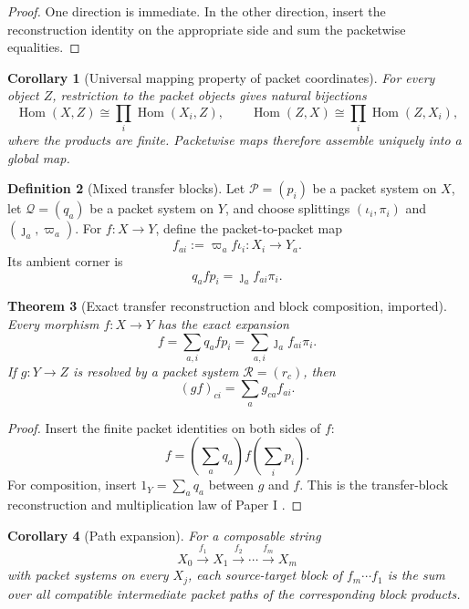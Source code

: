 \documentclass[11pt]{article}
\newtheorem{theorem}{Theorem}[section]
\newtheorem{corollary}[theorem]{Corollary}
\theoremstyle{definition}
\newtheorem{definition}[theorem]{Definition}
\theoremstyle{remark}
\begin{document}
\begin{proof}
One direction is immediate.  In the other direction, insert the reconstruction identity on the appropriate side and sum the packetwise equalities.
\end{proof}

\begin{corollary}[Universal mapping property of packet coordinates]
\label{cor:packet-universal-expanded}
For every object \(Z\), restriction to the packet objects gives natural bijections
\[
\operatorname{Hom}(X,Z)
\cong
\prod_i\operatorname{Hom}(X_i,Z),
\qquad
\operatorname{Hom}(Z,X)
\cong
\prod_i\operatorname{Hom}(Z,X_i),
\]
where the products are finite.  Packetwise maps therefore assemble uniquely into a global map.
\end{corollary}

\begin{definition}[Mixed transfer blocks]
\label{def:mixed-transfer-blocks-expanded}
Let \(\mathcal P=(p_i)\) be a packet system on \(X\), let \(\mathcal Q=(q_a)\) be a packet system on \(Y\), and choose splittings \((\iota_i,\pi_i)\) and \((\jmath_a,\varpi_a)\).  For \(f:X\to Y\), define the packet-to-packet map
\[
f_{ai}:=\varpi_a f\iota_i:X_i\longrightarrow Y_a.
\]
Its ambient corner is
\[
q_afp_i=\jmath_a f_{ai}\pi_i.
\]
\end{definition}

\begin{theorem}[Exact transfer reconstruction and block composition, imported]
\label{thm:transfer-reconstruction-expanded}
Every morphism \(f:X\to Y\) has the exact expansion
\[
\boxed{
f
=
\sum_{a,i}q_afp_i
=
\sum_{a,i}\jmath_a f_{ai}\pi_i.}
\]
If \(g:Y\to Z\) is resolved by a packet system \(\mathcal R=(r_c)\), then
\[
\boxed{
(gf)_{ci}
=
\sum_a g_{ca}f_{ai}.}
\]
\end{theorem}

\begin{proof}
Insert the finite packet identities on both sides of \(f\):
\[
f
=
\left(\sum_aq_a\right)f\left(\sum_ip_i\right).
\]
For composition, insert \(1_Y=\sum_aq_a\) between \(g\) and \(f\).  This is the transfer-block reconstruction and multiplication law of Paper I \cite{P1}.
\end{proof}

\begin{corollary}[Path expansion]
\label{cor:packet-path-expansion}
For a composable string
\[
X_0\xrightarrow{f_1}X_1\xrightarrow{f_2}\cdots\xrightarrow{f_m}X_m
\]
with packet systems on every \(X_j\), each source-target block of \(f_m\cdots f_1\) is the sum over all compatible intermediate packet paths of the corresponding block products.
\end{corollary}
\end{document}
